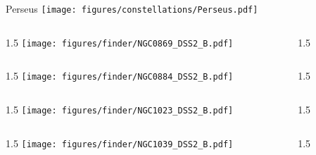 \documentclass[final]{beamer}
\newlength{\colwidth}
\begin{document}

\begin{frame}[t]{\LARGE Perseus}
  \centering
  \texttt{[image: figures/constellations/Perseus.pdf]}
\end{frame}


\begin{frame}[t]{}
  \begin{columns}[T]
    \begin{column}{1.5\colwidth}
      \centering
      \texttt{[image: figures/finder/NGC0869\_DSS2\_B.pdf]}
    \end{column}
    \begin{column}{1.5\colwidth}
      \Large
      
    \end{column}
  \end{columns}
  \vspace{\fill}
  \begin{columns}[T]
    \begin{column}{1.5\colwidth}
      \centering
      \texttt{[image: figures/finder/NGC0884\_DSS2\_B.pdf]}
    \end{column}
    \begin{column}{1.5\colwidth}
      \Large
      
    \end{column}
  \end{columns}
\end{frame}


\begin{frame}[t]{}
  \begin{columns}[T]
    \begin{column}{1.5\colwidth}
      \centering
      \texttt{[image: figures/finder/NGC1023\_DSS2\_B.pdf]}
    \end{column}
    \begin{column}{1.5\colwidth}
      \Large
      
    \end{column}
  \end{columns}
  \vspace{\fill}
  \begin{columns}[T]
    \begin{column}{1.5\colwidth}
      \centering
      \texttt{[image: figures/finder/NGC1039\_DSS2\_B.pdf]}
    \end{column}
    \begin{column}{1.5\colwidth}
      \Large
      
    \end{column}
  \end{columns}
\end{frame}
\end{document}
